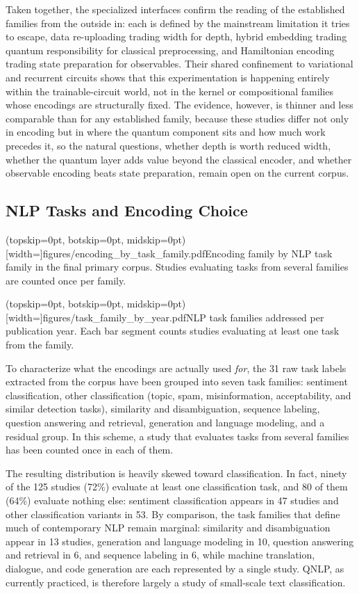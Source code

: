 \documentclass{ieeeaccess}
\begin{document}
Taken together, the specialized interfaces confirm the reading of the established families from the outside in: each is defined by the mainstream limitation it tries to escape, data re-uploading trading width for depth, hybrid embedding trading quantum responsibility for classical preprocessing, and Hamiltonian encoding trading state preparation for observables. Their shared confinement to variational and recurrent circuits shows that this experimentation is happening entirely within the trainable-circuit world, not in the kernel or compositional families whose encodings are structurally fixed. The evidence, however, is thinner and less comparable than for any established family, because these studies differ not only in encoding but in where the quantum component sits and how much work precedes it, so the natural questions, whether depth is worth reduced width, whether the quantum layer adds value beyond the classical encoder, and whether observable encoding beats state preparation, remain open on the current corpus.

\subsection{NLP Tasks and Encoding Choice}
\label{subsec:tasks_encodings}

\Figure[t!](topskip=0pt, botskip=0pt, midskip=0pt)[width=\textwidth]{figures/encoding_by_task_family.pdf}{Encoding family by NLP task family in the final primary corpus. Studies evaluating tasks from several families are counted once per family.\label{fig:encoding_task}}

\Figure[t!](topskip=0pt, botskip=0pt, midskip=0pt)[width=\textwidth]{figures/task_family_by_year.pdf}{NLP task families addressed per publication year. Each bar segment counts studies evaluating at least one task from the family.\label{fig:task_year}}

To characterize what the encodings are actually used \emph{for}, the 31 raw task labels extracted from the corpus have been grouped into seven task families: sentiment classification, other classification (topic, spam, misinformation, acceptability, and similar detection tasks), similarity and disambiguation, sequence labeling, question answering and retrieval, generation and language modeling, and a residual group. In this scheme, a study that evaluates tasks from several families has been counted once in each of them.

The resulting distribution is heavily skewed toward classification. In fact, ninety of the 125 studies (72\%) evaluate at least one classification task, and 80 of them (64\%) evaluate nothing else: sentiment classification appears in 47 studies and other classification variants in 53. By comparison, the task families that define much of contemporary NLP remain marginal: similarity and disambiguation appear in 13 studies, generation and language modeling in 10, question answering and retrieval in 6, and sequence labeling in 6, while machine translation, dialogue, and code generation are each represented by a single study. QNLP, as currently practiced, is therefore largely a study of small-scale text classification.
\end{document}
